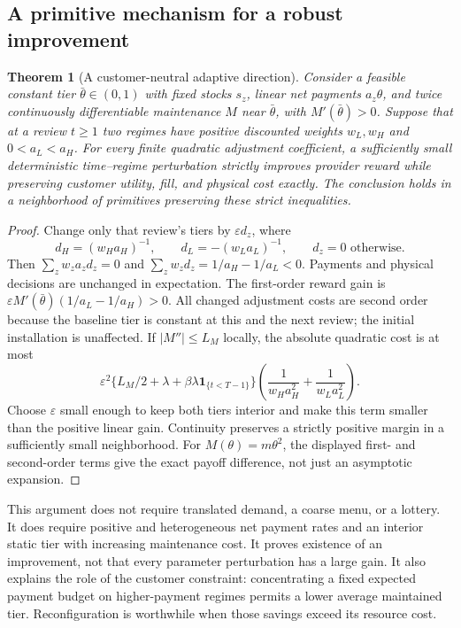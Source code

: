 \documentclass[11pt,letterpaper]{article}
\newtheorem{theorem}{Theorem}[section]
\theoremstyle{definition}
\newcommand{\1}{\mathbf 1}
\begin{document}
\subsection{A primitive mechanism for a robust improvement}
\begin{theorem}[A customer-neutral adaptive direction]\label{thm:local-gain}
Consider a feasible constant tier $\bar\theta\in(0,1)$ with fixed stocks $s_z$, linear net payments $a_z\theta$, and twice continuously differentiable maintenance $M$ near $\bar\theta$, with $M'(\bar\theta)>0$. Suppose that at a review $t\geq1$ two regimes have positive discounted weights $w_L,w_H$ and $0<a_L<a_H$. For every finite quadratic adjustment coefficient, a sufficiently small deterministic time--regime perturbation strictly improves provider reward while preserving customer utility, fill, and physical cost exactly. The conclusion holds in a neighborhood of primitives preserving these strict inequalities.
\end{theorem}
\begin{proof}
Change only that review's tiers by $\varepsilon d_z$, where
\[
 d_H=(w_Ha_H)^{-1},\qquad d_L=-(w_La_L)^{-1},\qquad d_z=0\text{ otherwise}.
\]
Then $\sum_z w_za_zd_z=0$ and $\sum_z w_zd_z=1/a_H-1/a_L<0$. Payments and physical decisions are unchanged in expectation. The first-order reward gain is
$\varepsilon M'(\bar\theta)(1/a_L-1/a_H)>0$.
All changed adjustment costs are second order because the baseline tier is constant at this and the next review; the initial installation is unaffected. If $|M''|\leq L_M$ locally, the absolute quadratic cost is at most
\[
 \varepsilon^2\{L_M/2+\lambda+\beta\lambda\mathbf1_{\{t<T-1\}}\}
       \left(\frac1{w_Ha_H^2}+\frac1{w_La_L^2}\right).
\]
Choose $\varepsilon$ small enough to keep both tiers interior and make this term smaller than the positive linear gain. Continuity preserves a strictly positive margin in a sufficiently small neighborhood. For $M(\theta)=m\theta^2$, the displayed first- and second-order terms give the exact payoff difference, not just an asymptotic expansion.
\end{proof}
This argument does not require translated demand, a coarse menu, or a lottery. It does require positive and heterogeneous net payment rates and an interior static tier with increasing maintenance cost. It proves existence of an improvement, not that every parameter perturbation has a large gain. It also explains the role of the customer constraint: concentrating a fixed expected payment budget on higher-payment regimes permits a lower average maintained tier. Reconfiguration is worthwhile when those savings exceed its resource cost.
\end{document}
